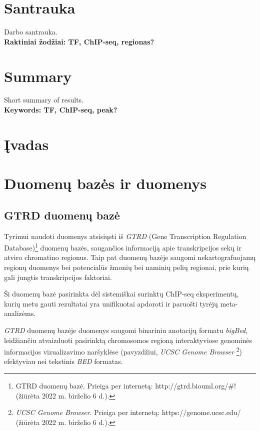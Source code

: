 \documentclass[12pt]{article}
\begin{document}
\section*{Santrauka}
Darbo santrauka.\\

\textbf{Raktiniai žodžiai: TF, ChIP-seq, regionas?}
\newpage

\section*{Summary}
Short summary of results.\\

\textbf{Keywords: TF, ChIP-seq, peak?}
\newpage

\section{Įvadas}
\newpage

\section{Duomenų bazės ir duomenys}
\subsection{GTRD duomenų bazė}
Tyrimui naudoti duomenys atsisiųsti iš \emph{GTRD}
(Gene Transcription Regulation Database)\footnote{GTRD duomenų bazė.
Prieiga per internetą: http://gtrd.biouml.org/\#!
(žiūrėta 2022 m. birželio 6 d.).}
duomenų bazės, saugančios informaciją apie transkripcijos
sekų ir atviro chromatino regionus. Taip pat duomenų bazėje saugomi
nekartografuojamų regionų duomenys bei potencialūs žmonių bei naminių
pelių regionai, prie kurių gali jungtis transkripcijos faktoriai.

Ši duomenų bazė pasirinkta dėl sistemiškai surinktų
ChIP-seq eksperimentų, kurių metu gauti rezultatai yra unifikuotai
apdoroti ir paruošti tyrėjų meta-analizėms.

\emph{GTRD} duomenų bazėje duomenys saugomi binariniu anotacijų
formatu \emph{bigBed}, leidžiančiu atvaizduoti pasirinktą
chromosomos regioną interaktyviose genominės informacijos
vizualizavimo naršyklėse (pavyzdžiui, \emph{UCSC Genome Browser}
\footnote{\emph{UCSC Genome Browser}. Prieiga per internetą:
https://genome.ucsc.edu/ (žiūrėta 2022 m. birželio 6 d.).})
efektyviau nei tekstinis \emph{BED} formatas.
\end{document}
